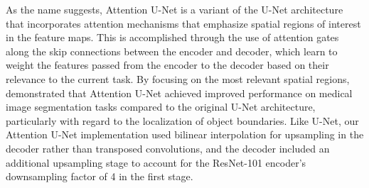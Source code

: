 As the name suggests, Attention U-Net is a variant of the U-Net architecture that incorporates attention mechanisms that emphasize spatial regions of interest in the feature maps.
This is accomplished through the use of attention gates along the skip connections between the encoder and decoder, which learn to weight the features passed from the encoder to the decoder based on their relevance to the current task.
By focusing on the most relevant spatial regions, \citet{oktayAttentionUNetLearning2018} demonstrated that Attention U-Net achieved improved performance on medical image segmentation tasks compared to the original U-Net architecture, particularly with regard to the localization of object boundaries.
Like U-Net, our Attention U-Net implementation used bilinear interpolation for upsampling in the decoder rather than transposed convolutions, and the decoder included an additional upsampling stage to account for the ResNet-101 encoder's downsampling factor of 4 in the first stage.





